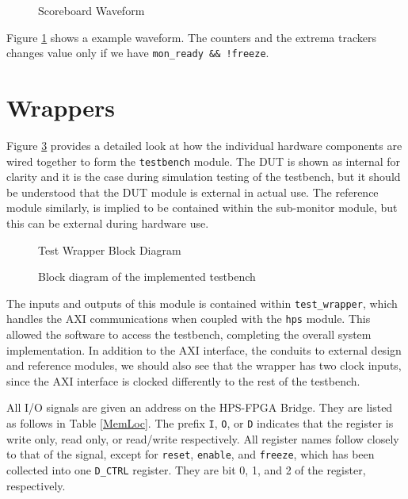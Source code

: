 \begin{figure}[H]
  \centering
  
  \caption{Scoreboard Waveform}
  \label{ScoreboardWave}
\end{figure}

Figure \ref{ScoreboardWave} shows a example waveform.
The counters and the extrema trackers changes value only if we have \texttt{mon\_ready \&\& !freeze}.

\section{Wrappers}

Figure \ref{DBlock} provides a detailed look at how the individual hardware components are wired together to form the \texttt{testbench} module.
The DUT is shown as internal for clarity and it is the case during simulation testing of the testbench, but it should be understood that the DUT module is external in actual use.
The reference module similarly, is implied to be contained within the sub-monitor module, but this can be external during hardware use.

\begin{figure}[H]
  \centering
  
  \caption{Test Wrapper Block Diagram}
  \label{WrapperBlk}
\end{figure}

\begin{sidewaysfigure}
  \begin{figure}[H]
    \centering
    
    \caption{Block diagram of the implemented testbench}
    \label{DBlock}
  \end{figure}
\end{sidewaysfigure}

The inputs and outputs of this module is contained within \texttt{test\_wrapper}, which handles the AXI communications when coupled with the \texttt{hps} module.
This allowed the software to access the testbench, completing the overall system implementation.
In addition to the AXI interface, the conduits to external design and reference modules, we should also see that the wrapper has two clock inputs, since the AXI interface is clocked differently to the rest of the testbench.

All I/O signals are given an address on the HPS-FPGA Bridge.
They are listed as follows in Table \ref{MemLoc}.
The prefix \texttt{I}, \texttt{O}, or \texttt{D} indicates that the register is write only, read only, or read/write respectively.
All register names follow closely to that of the signal, except for \texttt{reset}, \texttt{enable}, and \texttt{freeze}, which has been collected into one \texttt{D\_CTRL} register.
They are bit 0, 1, and 2 of the register, respectively.


